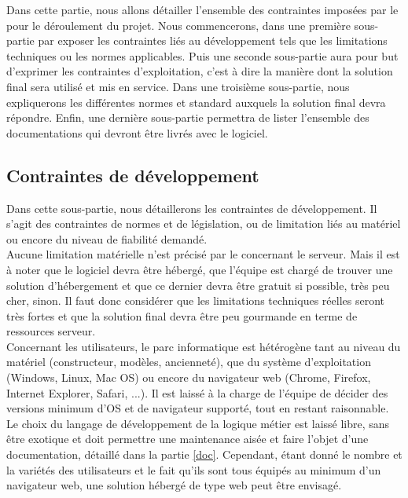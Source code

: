 Dans cette partie, nous allons détailler l'ensemble des contraintes imposées par le \client{} pour le déroulement du projet. Nous commencerons, dans une première sous-partie par exposer les contraintes liés au développement tels que les limitations techniques ou les normes applicables. Puis une seconde sous-partie aura pour but d'exprimer les contraintes d'exploitation, c'est à dire la manière dont la solution final sera utilisé et mis en service. Dans une troisième sous-partie, nous expliquerons les différentes normes et standard auxquels la solution final devra répondre. Enfin, une dernière sous-partie permettra de lister l'ensemble des documentations qui devront être livrés avec le logiciel.


\subsection{Contraintes de développement}
Dans cette sous-partie, nous détaillerons les contraintes de développement. Il s'agit des contraintes de normes et de législation, ou de limitation liés au matériel ou encore du niveau de fiabilité demandé.\\


Aucune limitation matérielle n'est précisé par le \client{} concernant le serveur. Mais il est à noter que le logiciel devra être hébergé, que l'équipe \PICCourt{} est chargé de trouver une solution d'hébergement et que ce dernier devra être gratuit si possible, très peu cher, sinon. Il faut donc considérer que les limitations techniques réelles seront très fortes et que la solution final devra être peu gourmande en terme de ressources serveur.\\

Concernant les utilisateurs, le parc informatique est hétérogène tant au niveau du matériel (constructeur, modèles, ancienneté), que du système d'exploitation (Windows, Linux, Mac OS) ou encore du navigateur web (Chrome, Firefox, Internet Explorer, Safari, ...). Il est laissé à la charge de l'équipe \PICCourt{} de décider des versions minimum d'OS et de navigateur supporté, tout en restant raisonnable.\\


Le choix du langage de développement de la logique métier est laissé libre, sans être exotique et doit permettre une maintenance aisée et faire l'objet d'une documentation, détaillé dans la partie \ref{doc}. Cependant, étant donné le nombre et la variétés des utilisateurs et le fait qu'ils sont tous équipés au minimum d'un navigateur web, une solution hébergé de type web peut être envisagé.\\

